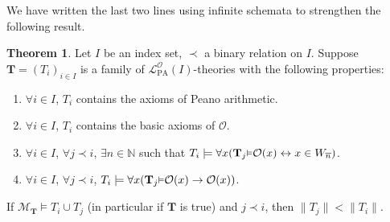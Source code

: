 \documentclass[reqno]{article}
\theoremstyle{definition}
\newtheorem{theorem}{Theorem}
\def\N{\mathbb{N}}
\def\L{\mathscr{L}}
\def\M{\mathscr{M}}
\def\T{\mathbf{T}}
\def\O{\mathcal{O}}
\def\LPO{\L^{\mathcal{O}}_{\mathrm{PA}}}
\renewcommand{\Pr}[1]{\T_{#1}\mbox{\small${\vDash}$}}
\begin{document}
We have written the last two lines using infinite schemata
to strengthen the following result.

\begin{theorem}
\label{olanguagestructurethm}
Let $I$ be an index set,
$\prec$ a binary relation on $I$.
Suppose $\T=(T_i)_{i\in I}$
is a family of $\LPO(I)$-theories
with the following properties:
\begin{enumerate}
\item $\forall i\in I$, $T_i$ contains the axioms of Peano arithmetic.
\item $\forall i\in I$, $T_i$ contains the basic axioms of $\O$.
\item $\forall i\in I$, $\forall j\prec i$, $\exists n\in\N$
such that $T_i\models\forall x(\Pr j\O(x)\leftrightarrow x\in W_{\overline n})$.
\item $\forall i\in I$, $\forall j\prec i$, $T_i\models \forall x(\Pr j\O(x)\rightarrow\O(x))$.
\end{enumerate}
If $\M_\T\models T_i\cup T_j$ (in particular if $\T$ is true)
and $j\prec i$, then $\|T_j\|<\|T_i\|$.
\end{theorem}
\end{document}
